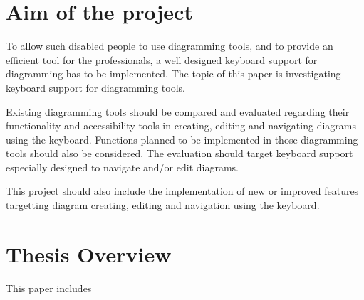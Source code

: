 \section{Aim of the project}
To allow such disabled people to use diagramming tools, and to provide an efficient tool for the professionals, a well designed keyboard support for diagramming has to be implemented.
The topic of this paper is investigating keyboard support for diagramming tools.

Existing diagramming tools should be compared and evaluated regarding their functionality and accessibility tools in creating, editing and navigating diagrams using the keyboard. Functions planned to be implemented in those diagramming tools should also be considered. The evaluation should target keyboard support especially designed to navigate and/or edit diagrams.

This project should also include the implementation of new or improved features targetting diagram creating, editing and navigation using the keyboard.

\section{Thesis Overview}
This paper includes 


